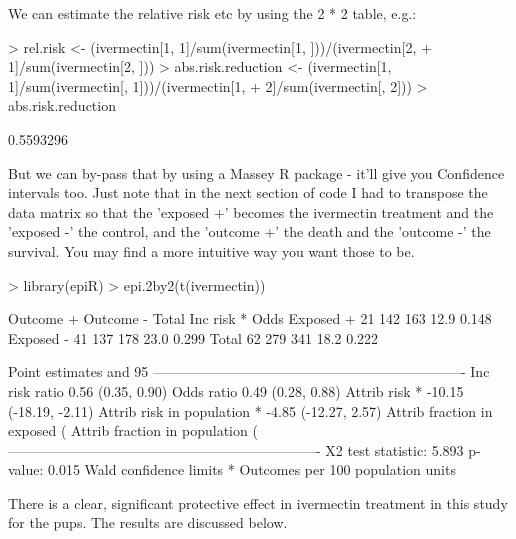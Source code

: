 \documentclass{article}
\begin{document}
We can estimate the relative risk etc by using the 2 * 2 table, e.g.:

\begin{Schunk}
\begin{Sinput}
> rel.risk <- (ivermectin[1, 1]/sum(ivermectin[1, ]))/(ivermectin[2, 
+     1]/sum(ivermectin[2, ]))
> abs.risk.reduction <- (ivermectin[1, 1]/sum(ivermectin[, 1]))/(ivermectin[1, 
+     2]/sum(ivermectin[, 2]))
> abs.risk.reduction
\end{Sinput}
\begin{Soutput}
[1] 0.5593296
\end{Soutput}
\end{Schunk}

But we can by-pass that by using a Massey R package - it'll give you Confidence intervals too. Just note that in the next section of code I had to transpose the data matrix so that the 'exposed +' becomes the ivermectin treatment and the 'exposed -' the control, and the 'outcome +' the death and the 'outcome -' the survival. You may find a more intuitive way you want those to be.

\begin{Schunk}
\begin{Sinput}
> library(epiR)
> epi.2by2(t(ivermectin))
\end{Sinput}
\begin{Soutput}
             Outcome +    Outcome -      Total        Inc risk *        Odds
Exposed +           21          142        163              12.9       0.148
Exposed -           41          137        178              23.0       0.299
Total               62          279        341              18.2       0.222

Point estimates and 95 %
-------------------------------------------------------------------
Inc risk ratio                               0.56 (0.35, 0.90)
Odds ratio                                   0.49 (0.28, 0.88)
Attrib risk *                                -10.15 (-18.19, -2.11)
Attrib risk in population *                  -4.85 (-12.27, 2.57)
Attrib fraction in exposed (%
Attrib fraction in population (%
-------------------------------------------------------------------
 X2 test statistic: 5.893 p-value: 0.015
 Wald confidence limits
 * Outcomes per 100 population units 
\end{Soutput}
\end{Schunk}

There is a clear, significant protective effect in ivermectin treatment in this study for the pups. The results are discussed below. 
\end{document}

